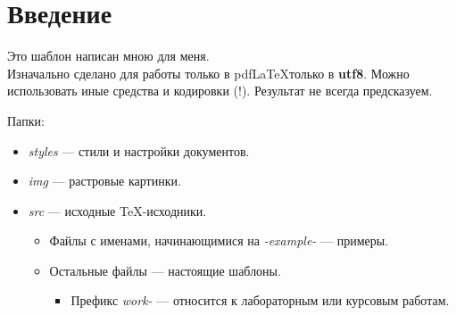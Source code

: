 \section{Введение}

Это шаблон написан мною для меня.\\
Изначально сделано для работы только в pdf\LaTeX только в \textbf{utf8}.
Можно использовать иные средства и кодировки (!). Результат не всегда предсказуем.




Папки:
\begin{itemize}
	\item \textit{styles} --- стили и настройки документов.
	\item \textit{img} --- растровые картинки.
	\item \textit{src} --- исходные \TeX-исходники.
	\begin{itemize}
		\item Файлы с именами, начинающимися на \textit{-example-} --- примеры.
		\item Остальные файлы --- настоящие шаблоны.
		\begin{itemize}
			\item Префикс \textit{work-} --- относится к лабораторным или курсовым работам.
		\end{itemize}	
	\end{itemize}
	
\end{itemize}

\pagebreak

